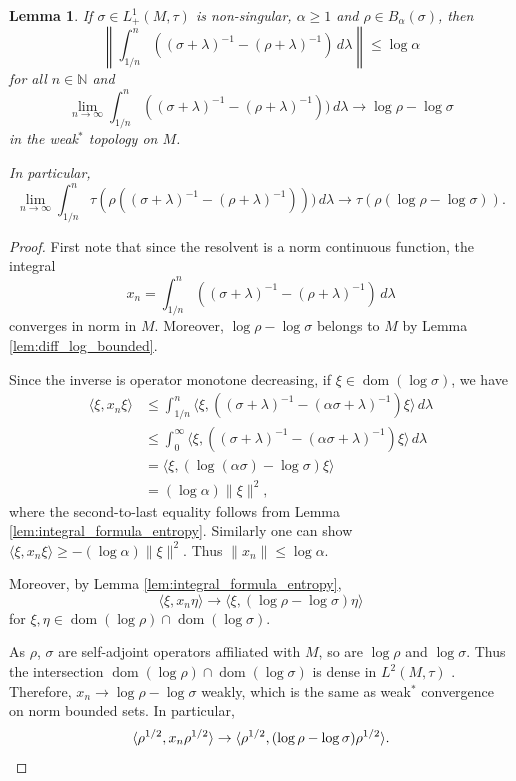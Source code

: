 \documentclass[12pt,a4paper]{amsart}
\newcommand{\1}{\mathds{1}}
\newcommand{\dom}{\operatorname{dom}}
\newcommand{\norm}[1]{\lVert#1\rVert}
\theoremstyle{plain}
\newtheorem{lemma}[proposition]{Lemma}
\theoremstyle{definition}
\theoremstyle{remark}
\begin{document}
\begin{lemma}\label{lem:approx_entropy}
If $\sigma\in L^1_+(M,\tau)$ is non-singular, $\alpha\geq 1$ and $\rho\in B_\alpha(\sigma)$, then
\begin{equation*}
\left\lVert \int_{1/n}^n ((\sigma+\lambda)^{-1}-(\rho+\lambda)^{-1})\,d\lambda\right\rVert\leq \log\alpha
\end{equation*}
for all $n\in\mathbb N$ and
\begin{equation*}
\lim_{n\to\infty}\int_{1/n}^n ((\sigma+\lambda)^{-1}-(\rho+\lambda)^{-1}))\,d\lambda\to\log\rho-\log\sigma
\end{equation*}
in the weak$^\ast$ topology on $M$.

In particular,
\begin{equation*}
\lim_{n\to\infty}\int_{1/n}^n\tau(\rho ((\sigma+\lambda)^{-1}-(\rho+\lambda)^{-1})))\,d\lambda\to\tau(\rho(\log\rho-\log\sigma)).
\end{equation*}
\end{lemma}
\begin{proof}
First note that since the resolvent is a norm continuous function, the integral 
\begin{equation*}
x_n=\int_{1/n}^n ((\sigma+\lambda)^{-1}-(\rho+\lambda)^{-1})\,d\lambda
\end{equation*}
converges in norm in $M$. Moreover, $\log\rho-\log\sigma$ belongs to $M$ by Lemma \ref{lem:diff_log_bounded}.

Since the inverse is operator monotone decreasing, if $\xi\in \dom(\log \sigma)$, we have
\begin{align*}
\langle\xi,x_n \xi\rangle&\leq \int_{1/n}^n \langle \xi,((\sigma+\lambda)^{-1}-(\alpha\sigma+\lambda)^{-1})\xi\rangle\,d\lambda\\
&\leq \int_0^\infty\langle \xi,((\sigma+\lambda)^{-1}-(\alpha\sigma+\lambda)^{-1})\xi\rangle\,d\lambda\\
&=\langle \xi,(\log(\alpha \sigma)-\log\sigma)\xi\rangle\\
&=(\log\alpha)\norm{\xi}^2,
\end{align*}
where the second-to-last equality follows from Lemma \ref{lem:integral_formula_entropy}. Similarly one can show $\langle\xi,x_n\xi\rangle\geq -(\log \alpha)\norm{\xi}^2$. Thus $\norm{x_n}\leq \log\alpha$.

Moreover, by Lemma \ref{lem:integral_formula_entropy},
\begin{equation*}
\langle\xi,x_n\eta\rangle\to \langle\xi,(\log\rho-\log\sigma)\eta\rangle
\end{equation*}
for $\xi,\eta\in \dom(\log\rho)\cap \dom(\log\sigma)$.

As $\rho$, $\sigma$ are self-adjoint operators affiliated with $M$, so are $\log\rho$ and $\log \sigma$. Thus the intersection $\dom(\log\rho)\cap \dom(\log\sigma)$ is dense in $L^2(M,\tau)$ \cite[Proposition 24]{Ter81}. Therefore, $x_n\to \log\rho-\log \sigma$ weakly, which is the same as weak$^\ast$ convergence on norm bounded sets. In particular,
\begin{equation*}
\langle \rho^{1/2},x_n\rho^{1/2}\rangle\to \langle \rho^{1/2},(\log\rho-\log\sigma)\rho^{1/2}\rangle.\qedhere
\end{equation*}
\end{proof}
\end{document}
